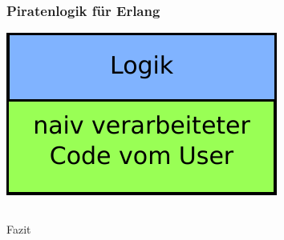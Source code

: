 \begin{frame}
\frametitle{Piratenlogik für Erlang}
\begin{center}

    \includegraphics[scale=1.0]{erlang/pics/ErlangVerarbeitungB}

\end{center}    

\end{frame}

\begin{frame}
\inputminted[linenos, frame=lines, tabsize=2, fontsize=\footnotesize  ]{erlang}{erlang/Beispiel.erl}
\begin{center}
 
\end{center}
\end{frame}

\begin{frame}
\begin{center}
\LARGE Fazit
\end{center}
\end{frame}
